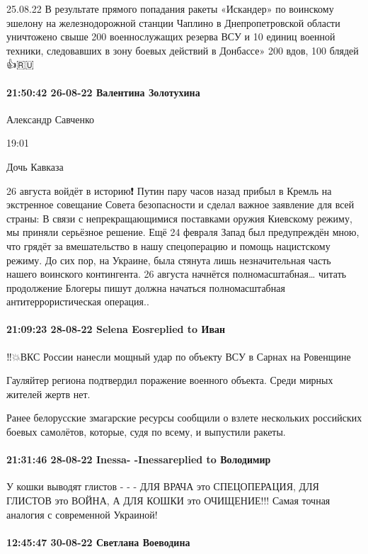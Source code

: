 25.08.22 В результате прямого попадания ракеты «Искандер» по воинскому эшелону
на железнодорожной станции Чаплино в Днепропетровской области уничтожено свыше
200 военнослужащих резерва ВСУ и 10 единиц военной техники, следовавших в зону
боевых действий в Донбассе» 200 вдов, 100 блядей 👍🇷🇺

\paragraph{21:50:42 26-08-22 Валентина Золотухина}

Александр Савченко

19:01

Дочь Кавказа

26 августа войдёт в историю❗️
Путин пару часов назад прибыл в Кремль на экстренное совещание Совета безопасности и сделал важное заявление для всей страны:
В связи с непрекращающимися поставками оружия Киевскому режиму, мы приняли серьёзное решение. Ещё 24 февраля Запад был предупреждён мною, что грядёт за вмешательство в нашу спецоперацию и помощь нацистскому режиму. До сих пор, на Украине, была стянута лишь незначительная часть нашего воинского контингента.
26 августа начнётся полномасштабная… читать продолжение
Блогеры пишут должна начаться полномасштабная антитеррористическая операция..

\paragraph{21:09:23 28-08-22 Selena Eosreplied to Иван}

‼️💥ВКС России нанесли мощный удар по объекту ВСУ в Сарнах на Ровенщине

Гауляйтер региона подтвердил поражение военного объекта. Среди мирных жителей жертв нет. 

Ранее белорусские змагарские ресурсы сообщили о взлете нескольких российских боевых самолётов, которые, судя по всему, и выпустили ракеты.

\paragraph{21:31:46 28-08-22 Inessa- -Inessareplied to Володимир}

У кошки выводят глистов - - -
ДЛЯ ВРАЧА это СПЕЦОПЕРАЦИЯ,
ДЛЯ ГЛИСТОВ это ВОЙНА,
А ДЛЯ КОШКИ это ОЧИЩЕНИЕ!!!
Самая точная аналогия с современной Украиной!

\paragraph{12:45:47 30-08-22 Светлана Воеводина}

